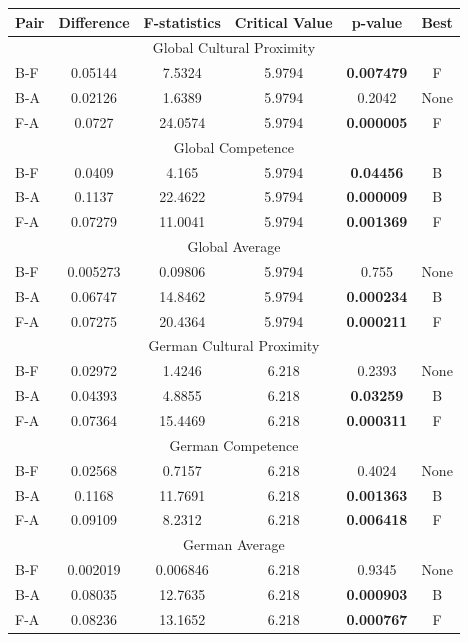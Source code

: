 \begin{table}
\centering
\begin{tabular}{lccccc}
\toprule
\textbf{Pair} & \textbf{Difference} & \textbf{F-statistics} & \textbf{Critical Value} & \textbf{p-value} & \textbf{Best} \\
\midrule
\multicolumn{6}{c}{Global Cultural Proximity} \\
\midrule
B-F & 0.05144 & 7.5324 & 5.9794 & \textbf{0.007479} & F \\
B-A & 0.02126 & 1.6389 & 5.9794 & 0.2042& None \\
F-A & 0.0727 & 24.0574 & 5.9794 & \textbf{0.000005}& F \\
\midrule
\multicolumn{6}{c}{Global Competence} \\
\midrule
B-F & 0.0409 & 4.165 & 5.9794 & \textbf{0.04456}& B \\
B-A & 0.1137 & 22.4622 & 5.9794 & \textbf{0.000009}& B \\
F-A & 0.07279 & 11.0041 & 5.9794 & \textbf{0.001369}& F \\
\midrule
\multicolumn{6}{c}{Global Average} \\
\midrule
B-F & 0.005273 & 0.09806 & 5.9794 & 0.755& None \\
B-A & 0.06747 & 14.8462 & 5.9794 & \textbf{0.000234} & B \\
F-A & 0.07275 & 20.4364 & 5.9794 & \textbf{0.000211} & F \\
\midrule
\multicolumn{6}{c}{German Cultural Proximity} \\
\midrule
B-F & 0.02972 & 1.4246 & 6.218 & 0.2393 & None\\
B-A & 0.04393 & 4.8855 & 6.218 & \textbf{0.03259}& B \\
F-A & 0.07364 & 15.4469 & 6.218 & \textbf{0.000311}& F \\
\midrule
\multicolumn{6}{c}{German Competence} \\
\midrule
B-F & 0.02568 & 0.7157 & 6.218 & 0.4024& None \\
B-A & 0.1168 & 11.7691 & 6.218 & \textbf{0.001363}& B \\
F-A & 0.09109 & 8.2312 & 6.218 & \textbf{0.006418}& F \\
\midrule
\multicolumn{6}{c}{German Average} \\
\midrule
B-F & 0.002019 & 0.006846 & 6.218 & 0.9345& None \\
B-A & 0.08035 & 12.7635 & 6.218 & \textbf{0.000903}& B \\
F-A & 0.08236 & 13.1652 & 6.218 & \textbf{0.000767}& F \\

\end{tabular}
\end{table}
